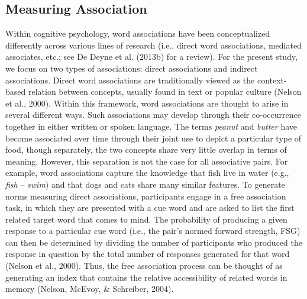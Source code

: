 \documentclass[english,,man]{apa6}
\begin{document}
\hypertarget{measuring-association}{%
\subsection{Measuring Association}\label{measuring-association}}

Within cognitive psychology, word associations have been conceptualized differently across various lines of research (i.e., direct word associations, mediated associates, etc.; see De Deyne et al. (2013b) for a review). For the present study, we focus on two types of associations: direct associations and indirect associations. Direct word associations are traditionally viewed as the context-based relation between concepts, usually found in text or popular culture (Nelson et al., 2000). Within this framework, word associations are thought to arise in several different ways. Such associations may develop through their co-occurrence together in either written or spoken language. The terms \emph{peanut} and \emph{butter} have become associated over time through their joint use to depict a particular type of food, though separately, the two concepts share very little overlap in terms of meaning. However, this separation is not the case for all associative pairs. For example, word associations capture the knowledge that fish live in water (e.g., \emph{fish} -- \emph{swim}) and that dogs and cats share many similar features. To generate norms measuring direct associations, participants engage in a free association task, in which they are presented with a cue word and are asked to list the first related target word that comes to mind. The probability of producing a given response to a particular cue word (i.e., the pair's normed forward strength, FSG) can then be determined by dividing the number of participants who produced the response in question by the total number of responses generated for that word (Nelson et al., 2000). Thus, the free association process can be thought of as generating an index that contains the relative accessibility of related words in memory (Nelson, McEvoy, \& Schreiber, 2004).
\end{document}
